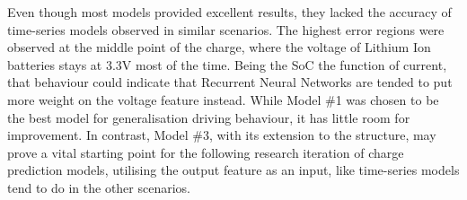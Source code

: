 %
%
Even though most models provided excellent results, they lacked the accuracy of time-series models observed in similar scenarios.
The highest error regions were observed at the middle point of the charge, where the voltage of Lithium Ion batteries stays at 3.3V most of the time.
Being the SoC the function of current, that behaviour could indicate that Recurrent Neural Networks are tended to put more weight on the voltage feature instead.
While Model \#1 was chosen to be the best model for generalisation driving behaviour, it has little room for improvement.
In contrast, Model \#3, with its extension to the structure, may prove a vital starting point for the following research iteration of charge prediction models, utilising the output feature as an input, like time-series models tend to do in the other scenarios.
